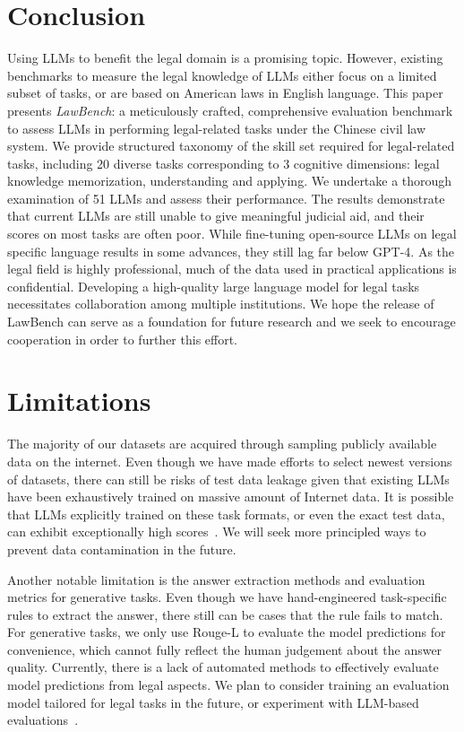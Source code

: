 \section{Conclusion}
Using LLMs to benefit the legal domain is a promising topic. However, existing benchmarks to measure the legal knowledge of LLMs either focus on a limited subset of tasks, or are based on American laws in English language. This paper presents \emph{LawBench}: a meticulously crafted, comprehensive evaluation benchmark to assess LLMs in performing legal-related tasks under the Chinese civil law system. We provide  structured taxonomy of the skill set required for legal-related tasks, including 20 diverse tasks corresponding to 3 cognitive dimensions: legal knowledge memorization, understanding and applying. We undertake a thorough examination of 51 LLMs and assess their performance. The results demonstrate that current LLMs are still unable to give meaningful judicial aid, and their scores on most tasks are often poor. While fine-tuning open-source LLMs on legal specific language results in some advances, they still lag far below GPT-4. As the legal field is highly professional, much of the data used in practical applications is confidential. Developing a high-quality large language model for legal tasks necessitates collaboration among multiple institutions. We hope the release of LawBench can serve as a foundation for future research and we seek to encourage cooperation in order to further this effort.

\section*{Limitations}

The majority of our datasets are acquired through sampling publicly available data on the internet. Even though we have made efforts to select newest versions of datasets, there can still be risks of test data leakage given that existing LLMs have been exhaustively trained on massive amount of Internet data. It is possible that LLMs explicitly trained on these task formats, or even the exact test data, can exhibit exceptionally high scores~\cite{schaeffer2023pretraining}. We will seek more principled ways to prevent data contamination in the future.

Another notable limitation is the answer extraction methods and evaluation metrics for generative tasks. Even though we have hand-engineered task-specific rules to extract the answer, there still can be cases that the rule fails to match. For generative tasks, we only use Rouge-L to evaluate the model predictions for convenience, which cannot fully reflect the human judgement about the answer quality. Currently, there is a lack of automated methods to effectively evaluate model predictions from legal aspects. We plan to consider training an evaluation model tailored for legal tasks in the future, or experiment with LLM-based evaluations~\cite{liu2023mmbench,yu2023kola}.

